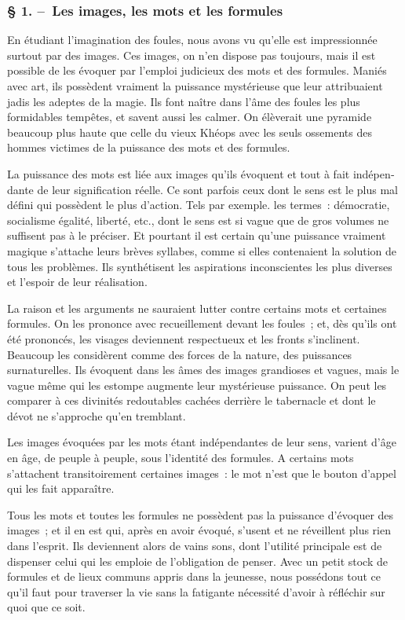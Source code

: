 \documentclass[french,twoside]{book} %
\begin{document}
\subsubsection[{§ 1. – Les images, les mots et les formules}]{§ 1. – Les images, les mots et les formules}
\noindent En étudiant l’imagination des foules, nous avons vu qu’elle est impressionnée surtout par des images. Ces images, on n’en dispose pas toujours, mais il est possible de les évoquer par l’emploi judicieux des mots et des formules. Maniés avec art, ils possèdent vraiment la puissance mystérieuse que leur attribuaient jadis les adeptes de la magie. Ils font naître dans l’âme des foules les plus formidables tempêtes, et savent aussi les calmer. On élèverait une pyramide beaucoup plus haute que celle du vieux Khéops avec les seuls ossements des hommes victimes de la puissance des mots et des formules.\par
La puissance des mots est liée aux images qu’ils évoquent et tout à fait indépen­dante de leur signification réelle. Ce sont parfois ceux dont le sens est le plus mal défini qui possèdent le plus d’action. Tels par exemple. les termes : démocratie, socia­lisme égalité, liberté, etc., dont le sens est si vague que de gros volumes ne suffisent pas à le préciser. Et pourtant il est certain qu’une puissance vraiment magique s’atta­che leurs brèves syllabes, comme si elles contenaient la solution de tous les problèmes. Ils synthétisent les aspirations inconscientes les plus diverses et l’espoir de leur réalisation.\par
La raison et les arguments ne sauraient lutter contre certains mots et certaines formules. On les prononce avec recueillement devant les foules ; et, dès qu’ils ont été prononcés, les visages deviennent respectueux et les fronts s’inclinent. Beaucoup les considèrent comme des forces de la nature, des puissances surnaturelles. Ils évoquent dans les âmes des images grandioses et vagues, mais le vague même qui les estompe augmente leur mystérieuse puissance. On peut les comparer à ces divinités redou­tables cachées derrière le tabernacle et dont le dévot ne s’approche qu’en tremblant.\par
Les images évoquées par les mots étant indépendantes de leur sens, varient d’âge en âge, de peuple à peuple, sous l’identité des formules. A certains mots s’attachent transitoirement certaines images : le mot n’est que le bouton d’appel qui les fait apparaître.\par
Tous les mots et toutes les formules ne possèdent pas la puissance d’évoquer des images ; et il en est qui, après en avoir évoqué, s’usent et ne réveillent plus rien dans l’esprit. Ils deviennent alors de vains sons, dont l’utilité principale est de dispenser celui qui les emploie de l’obligation de penser. Avec un petit stock de for­mules et de lieux communs appris dans la jeunesse, nous possédons tout ce qu’il faut pour traver­ser la vie sans la fatigante nécessité d’avoir à réfléchir sur quoi que ce soit.\par
\end{document}
